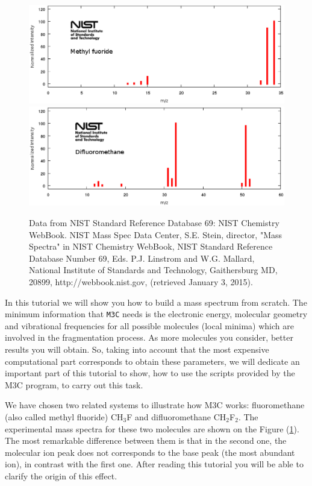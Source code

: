 \documentclass[a4paper,12pt]{article}
\begin{document}
\begin{figure}[h]
\centering
\includegraphics[scale=0.45]{images/NIST-CH3F.eps}
\includegraphics[scale=0.45]{images/NIST-CH2F2.eps}
\caption{\footnotesize{
Data from NIST Standard Reference Database 69: NIST Chemistry WebBook.
NIST Mass Spec Data Center, S.E. Stein, director, "Mass Spectra" in NIST Chemistry WebBook, NIST Standard Reference 
Database Number 69, Eds. P.J. Linstrom and W.G. Mallard, National Institute of Standards and Technology, Gaithersburg 
MD, 20899, http://webbook.nist.gov, (retrieved January 3, 2015). 
}}
\label{fig: experimental mass spectra}
\end{figure}

In this tutorial we will show you how to build a mass spectrum from scratch. The minimum information that \texttt{M3C} needs is 
the electronic energy, molecular geometry and vibrational frequencies for all possible molecules (local minima) which 
are involved in the fragmentation process. As more molecules you consider, better results you will obtain. So, taking 
into account that the most expensive computational part corresponds to obtain these parameters, we will dedicate an 
important part of this tutorial to show, how to use the scripts provided by the M3C program, to carry out this task.

We have chosen two related systems to illustrate how M3C works: fluoromethane (also called methyl fluoride) CH$_3$F and 
difluoromethane CH$_ 2$F$_2$. The experimental mass spectra for these two molecules are shown on the Figure 
(\ref{fig: experimental mass spectra}). The most remarkable difference between them is that in the second one, 
the molecular ion peak does not corresponds to the base peak (the most abundant ion), in contrast with the first one. 
After reading this tutorial you will be able to clarify the origin of this effect.
\end{document}
